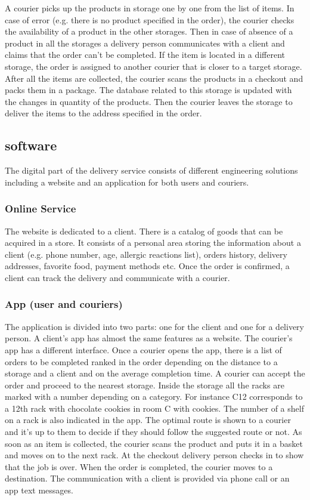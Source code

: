 A courier picks up the products in storage one by one from the list of items. In case of error (e.g. there is no product specified in the order), the courier checks the availability of a product in the other storages. Then in case of absence of a product in all the storages a delivery person communicates with a client and claims that the order can’t be completed. If the item is located in a different storage, the order is assigned to another courier that is closer to a target storage. After all the items are collected, the courier scans the products in a checkout and packs them in a package. The database related to this storage is updated with the changes in quantity of the products. Then the courier leaves the storage to deliver the items to the address specified in the order.

\subsection{software}

The digital part of the delivery service consists of different engineering solutions including a website and an application for both users and couriers.

\subsubsection{Online Service}

The website is dedicated to a client. There is a catalog of goods that can be acquired in a store. It consists of a personal area storing the information about a client (e.g. phone number, age, allergic reactions list), orders history, delivery addresses, favorite food, payment methods etc. Once the order is confirmed, a client can track the delivery and communicate with a courier.

\subsubsection{App (user and couriers)}

The application is divided into two parts: one for the client and one for a delivery person. A client’s app has almost the same features as a website. The courier’s app has a different interface. Once a courier opens the app, there is a list of orders to be completed ranked in the order depending on the distance to a storage and a client and on the average completion time. A courier can accept the order and proceed to the nearest storage. Inside the storage all the racks are marked with a number depending on a category. For instance C12 corresponds to a 12th rack with chocolate cookies in room C with cookies. The number of a shelf on a rack is also indicated in the app. The optimal route is shown to a courier and it’s up to them to decide if they should follow the suggested route or not. As soon as an item is collected, the courier scans the product and puts it in a basket and moves on to the next rack. At the checkout delivery person checks in to show that the job is over. When the order is completed, the courier moves to a destination. The communication with a client is provided via phone call or an app text messages.

